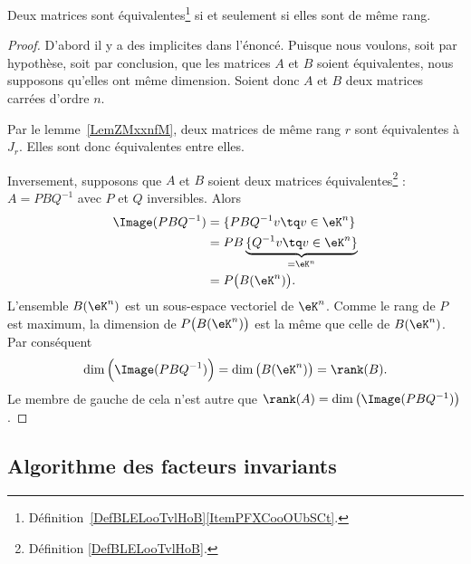 \begin{corollary}      \label{CorGOUYooErfOIe}
	Deux matrices sont équivalentes\footnote{Définition~\ref{DefBLELooTvlHoB}\ref{ItemPFXCooOUbSCt}.} si et seulement si elles sont de même rang.
\end{corollary}

\begin{proof}
	D'abord il y a des implicites dans l'énoncé. Puisque nous voulons, soit par hypothèse, soit par conclusion, que les matrices \( A\) et \( B\) soient équivalentes, nous supposons qu'elles ont même dimension. Soient donc \( A\) et \( B\) deux matrices carrées d'ordre \( n \).

	Par le lemme~\ref{LemZMxxnfM}, deux matrices de même rang \( r\) sont équivalentes à \( J_r\). Elles sont donc équivalentes entre elles.

	Inversement, supposons que \( A\) et \( B\) soient deux matrices équivalentes\footnote{Définition \ref{DefBLELooTvlHoB}.} : \( A=PBQ^{-1}\) avec \( P\) et \( Q\) inversibles. Alors
	\begin{subequations}
		\begin{align}
			\Image(PBQ^{-1}) & =\{ PBQ^{-1}v\tq v\in \eK^n \}                       \\
			                 & =PB\underbrace{\{ Q^{-1}v\tq v\in \eK^n \}}_{=\eK^n} \\
			                 & =P\big( B(\eK^n) \big).
		\end{align}
	\end{subequations}
	L'ensemble \( B(\eK^n)\) est un sous-espace vectoriel de \( \eK^n\). Comme le rang de \( P\) est maximum, la dimension de \( P\big( B(\eK^n) \big)\) est la même que celle de \( B(\eK^n)\). Par conséquent
	\begin{equation}
		\dim\Big( \Image(PBQ^{-1}) \Big)=\dim\big( B(\eK^n) \big)=\rank(B).
	\end{equation}
	Le membre de gauche de cela n'est autre que \( \rank(A)=\dim\big( \Image(PBQ^{-1}) \big)\).
\end{proof}

\subsection{Algorithme des facteurs invariants}

